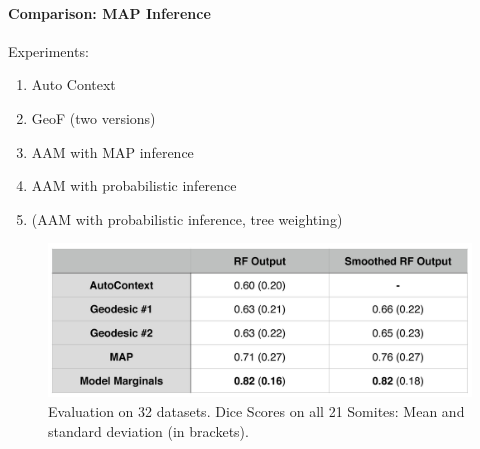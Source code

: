 \documentclass[10pt,twocolumn,letterpaper]{article}
\begin{document}
\paragraph{Comparison: MAP Inference}

Experiments:
\begin{enumerate}
\item Auto Context
\item GeoF (two versions)
\item AAM with MAP inference 
\item AAM with probabilistic inference 
\item (AAM with probabilistic inference, tree weighting)
\end{enumerate}

\begin{figure}[t]
\begin{center}
\includegraphics[width=\columnwidth]{TableDiceScores.jpg} %
\caption{Evaluation on 32 datasets. Dice Scores on all 21 Somites: Mean and standard deviation (in brackets).}
\label{tab:results}
\end{center}
\end{figure}
\end{document}
